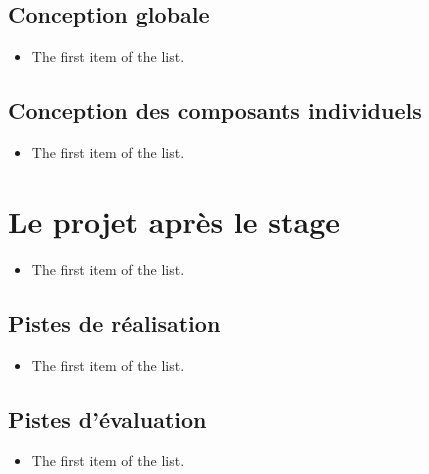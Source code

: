 \documentclass{rapport_stage}
\begin{document}
\chapter{Conception globale}

\begin{itemize}[label=$\bullet$]
  \item The first item of the list.
\end{itemize}

\chapter{Conception des composants individuels}

\begin{itemize}[label=$\bullet$]
  \item The first item of the list.
\end{itemize}





\cleardoublepage


\part{Le projet après le stage}

\begin{itemize}[label=$\bullet$]
  \item The first item of the list.
\end{itemize}

\chapter{Pistes de réalisation}

\begin{itemize}[label=$\bullet$]
  \item The first item of the list.
\end{itemize}

\chapter{Pistes d'évaluation}

\begin{itemize}[label=$\bullet$]
  \item The first item of the list.
\end{itemize}
\end{document}
